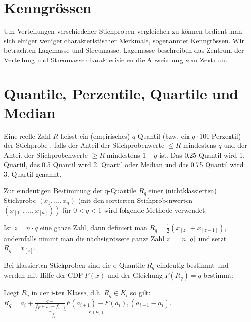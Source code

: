 \documentclass[10pt]{article}
\begin{document}
\section*{Kenngrössen}
Um Verteilungen verschiedener Stichproben vergleichen zu können bedient man sich einiger weniger charakteristischer Merkmale, sogenannter Kenngrössen. Wir betrachten Lagemasse und Streumasse. Lagemasse beschreiben das Zentrum der Verteilung und Streumasse charakterisieren die Abweichung vom Zentrum.

\section*{Quantile, Perzentile, Quartile und Median}
Eine reelle Zahl $R$ heisst ein (empirisches) $q$-Quantil (bzw. ein $q \cdot 100$ Perzentil) der Stichprobe , falls der Anteil der Stichprobenwerte $\leq R$ mindestens $q$ und der Anteil der Stichprobenwerte $\geq R$ mindestens $1-q$ ist. Das 0.25 Quantil wird 1. Quartil, das 0.5 Quantil wird 2. Quartil oder Median und das 0.75 Quantil wird 3. Quartil genannt.

Zur eindeutigen Bestimmung der q-Quantile $R_{q}$ einer (nichtklassierten) Stichprobe $\left(x_{1}, \ldots, x_{n}\right)$ (mit den sortierten Stichprobenwerten $\left.\left(x_{[1]}, \ldots, x_{[n]}\right)\right)$ für $0<q<1$ wird folgende Methode verwendet:

Ist $z=n \cdot q$ eine ganze Zahl, dann definiert man $R_{q}=\frac{1}{2}\left(x_{[z]}+x_{[z+1]}\right)$, andernfalls nimmt man die nächstgrössere ganze Zahl $z=\lceil n \cdot q\rceil$ und setzt $R_{q}=x_{[z]}$.

Bei klassierten Stichproben sind die q-Quantile $R_{q}$ eindeutig bestimmt und werden mit Hilfe der CDF $F(x)$ und der Gleichung $F\left(R_{q}\right)=q$ bestimmt:

Liegt $R_{q}$ in der i-ten Klasse, d.h. $R_{q} \in K_{i}$ so gilt: $R_{q}=a_{i}+\underbrace{\frac{q-}{f_{F}+\ldots+f_{i-1}}}_{=f_{i}} \underset{F\left(a_{i}\right)}{F\left(a_{i+1}\right)-F\left(a_{i}\right)},\left(a_{i+1}-a_{i}\right)$.
\end{document}
